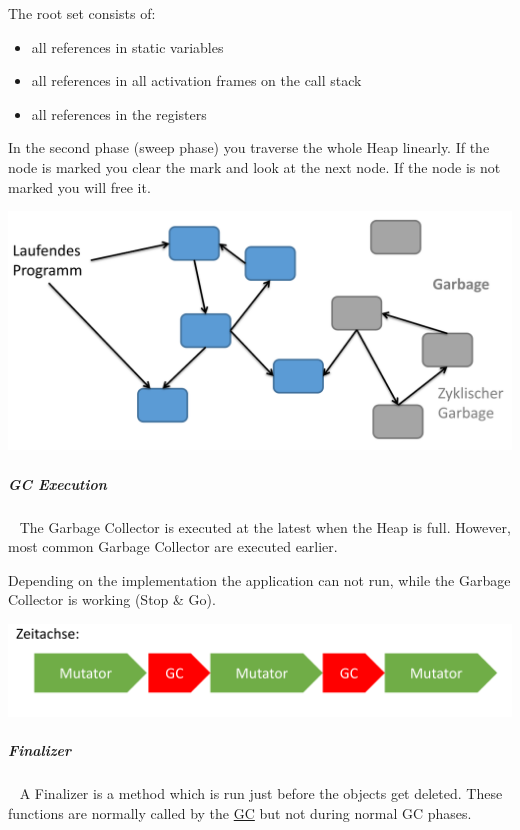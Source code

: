 \documentclass[11pt,twoside,landscape]{article}
\begin{document}
\begin{multicols}{3}
The root set consists of:
\begin{itemize}
\item all references in static variables
\item all references in all activation frames on the call stack
\item all references in the registers
\end{itemize}

In the second phase (sweep phase) you traverse the whole Heap linearly.
If the node is marked you clear the mark and look at the next node.
If the node is not marked you will free it.


{
\begin{center}
\includegraphics[width=.9\linewidth]{img/heap_graph.png}
\end{center}
\label{fig:heap-graph-of-nodes}
}

\subparagraph{GC Execution} \
\label{sec:orgfed647a}
The Garbage Collector is executed at the latest when the Heap is full.
However, most common Garbage Collector are executed earlier.

Depending on the implementation the application can not run, while the Garbage Collector is working (Stop \& Go).


{
\begin{center}
\includegraphics[width=.9\linewidth]{img/stop_and_go_gc.png}
\end{center}
\label{fig:stop-go-gc}
}

\subparagraph{Finalizer} \
\label{sec:org48ed3ce}
A Finalizer is a method which is run just before the objects get deleted.
These functions are normally called by the \href{../../../roam/20211008083744-garbage_collection.org}{GC} but not during normal GC phases.


\end{multicols}
\end{document}
